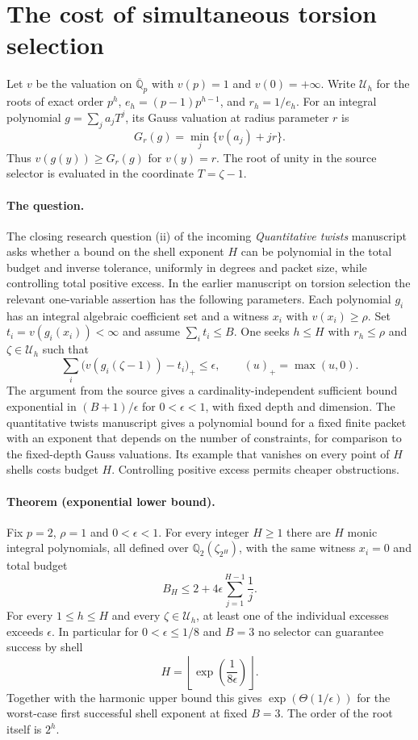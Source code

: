 \section{The cost of simultaneous torsion selection}

Let $v$ be the valuation on $\overline{\mathbb Q}_p$ with $v(p)=1$ and $v(0)=+\infty$. Write $\mathcal U_h$ for the roots of exact order $p^h$, $e_h=(p-1)p^{h-1}$, and $r_h=1/e_h$. For an integral polynomial $g=\sum_j a_jT^j$, its Gauss valuation at radius parameter $r$ is
\[
 G_r(g)=\min_j\{v(a_j)+jr\}.
\]
Thus $v(g(y))\ge G_r(g)$ for $v(y)=r$. The root of unity in the source selector is evaluated in the coordinate $T=\zeta-1$.

\paragraph{The question.}
The closing research question (ii) of the incoming \emph{Quantitative twists} manuscript \cite{priortorsion} asks whether a bound on the shell exponent $H$ can be polynomial in the total budget and inverse tolerance, uniformly in degrees and packet size, while controlling total positive excess. In the earlier manuscript on torsion selection the relevant one-variable assertion has the following parameters. Each polynomial $g_i$ has an integral algebraic coefficient set and a witness $x_i$ with $v(x_i)\ge\rho$. Set $t_i=v(g_i(x_i))<\infty$ and assume $\sum_i t_i\le B$. One seeks $h\le H$ with $r_h\le\rho$ and $\zeta\in\mathcal U_h$ such that
\[
 \sum_i \big(v(g_i(\zeta-1))-t_i\big)_+\le\epsilon,
 \qquad (u)_+=\max(u,0).
\]
The argument from the source gives a cardinality-independent sufficient bound exponential in $(B+1)/\epsilon$ for $0<\epsilon<1$, with fixed depth and dimension. The quantitative twists manuscript gives a polynomial bound for a fixed finite packet with an exponent that depends on the number of constraints, for comparison to the fixed-depth Gauss valuations. Its example that vanishes on every point of $H$ shells costs budget $H$. Controlling positive excess permits cheaper obstructions.

\paragraph{Theorem (exponential lower bound).}
Fix $p=2$, $\rho=1$ and $0<\epsilon<1$. For every integer $H\ge1$ there are $H$ monic integral polynomials, all defined over $\mathbb Q_2(\zeta_{2^H})$, with the same witness $x_i=0$ and total budget
\[
 B_H\le 2+4\epsilon\sum_{j=1}^{H-1}\frac1j .
\]
For every $1\le h\le H$ and every $\zeta\in\mathcal U_h$, at least one of the individual excesses exceeds $\epsilon$. In particular for $0<\epsilon\le1/8$ and $B=3$ no selector can guarantee success by shell
\[
 H=\left\lfloor\exp\!\left(\frac{1}{8\epsilon}\right)\right\rfloor.
\]
Together with the harmonic upper bound this gives $\exp(\Theta(1/\epsilon))$ for the worst-case first successful shell exponent at fixed $B=3$. The order of the root itself is $2^h$.

